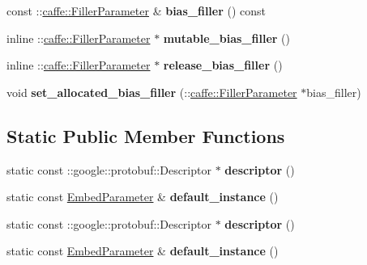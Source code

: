 \begin{DoxyCompactItemize}
const \+::\mbox{\hyperlink{classcaffe_1_1_filler_parameter}{caffe\+::\+Filler\+Parameter}} \& {\bfseries bias\+\_\+filler} () const
\item 
\mbox{\label{classcaffe_1_1_embed_parameter_ade9482092d14bf40b9c4e7858fa7acb9}} 
inline \+::\mbox{\hyperlink{classcaffe_1_1_filler_parameter}{caffe\+::\+Filler\+Parameter}} $\ast$ {\bfseries mutable\+\_\+bias\+\_\+filler} ()
\item 
\mbox{\label{classcaffe_1_1_embed_parameter_ab6fc9a2fab5c51d4d75c084e7c64f047}} 
inline \+::\mbox{\hyperlink{classcaffe_1_1_filler_parameter}{caffe\+::\+Filler\+Parameter}} $\ast$ {\bfseries release\+\_\+bias\+\_\+filler} ()
\item 
\mbox{\label{classcaffe_1_1_embed_parameter_a1b8dd0b26c9aedb17762ab6ce0220082}} 
void {\bfseries set\+\_\+allocated\+\_\+bias\+\_\+filler} (\+::\mbox{\hyperlink{classcaffe_1_1_filler_parameter}{caffe\+::\+Filler\+Parameter}} $\ast$bias\+\_\+filler)
\end{DoxyCompactItemize}
\subsection*{Static Public Member Functions}
\begin{DoxyCompactItemize}
\item 
\mbox{\label{classcaffe_1_1_embed_parameter_a93dc5680ee98e19a54c160ecf8384210}} 
static const \+::google\+::protobuf\+::\+Descriptor $\ast$ {\bfseries descriptor} ()
\item 
\mbox{\label{classcaffe_1_1_embed_parameter_a76e55a7cbf0f084d0f676ff5988f0cb2}} 
static const \mbox{\hyperlink{classcaffe_1_1_embed_parameter}{Embed\+Parameter}} \& {\bfseries default\+\_\+instance} ()
\item 
\mbox{\label{classcaffe_1_1_embed_parameter_a610a3dd8692b649126bc51bc5432d165}} 
static const \+::google\+::protobuf\+::\+Descriptor $\ast$ {\bfseries descriptor} ()
\item 
\mbox{\label{classcaffe_1_1_embed_parameter_ae7117eed29bab29a3726ce9cfb94eb0a}} 
static const \mbox{\hyperlink{classcaffe_1_1_embed_parameter}{Embed\+Parameter}} \& {\bfseries default\+\_\+instance} ()
\end{DoxyCompactItemize}
